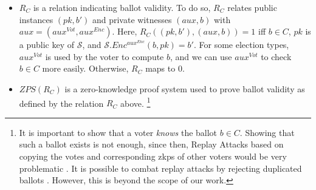 \begin{definition}
\begin{itemize}
    \item $R_C$ is a relation indicating ballot validity.
    To do so, $R_C$ relates public instances $(pk, b')$ and private witnesses $(aux, b)$ with $aux=(aux^{Vot}, aux^{Enc})$.
    Here, $R_C((pk, b'), (aux, b))=1$ iff $b\in C$, $pk$ is a public key of $\mathcal{S}$, and $\mathcal{S}.Enc^{aux^{Enc}}(b, pk)=b'$.
    For some election types, $aux^{Vot}$ is used by the voter to compute $b$, and we can use $aux^{Vot}$ to check $b\in C$ more easily.
    Otherwise, $R_C$ maps to $0$.
    \item $ZPS(R_C)$ is a zero-knowledge proof system used to prove ballot validity as defined by the relation $R_C$ above.%
    \footnote{\label{footnote:zkpKnowVsExists}
      It is important to show that a voter \textit{knows} the ballot $b\in C$. 
      Showing that such a ballot exists is not enough, since then, Replay Attacks based on copying the votes and corresponding \glspl{zkp} of other voters would be very problematic \cite{mestel_how_2022}. 
      It is possible to combat replay attacks by rejecting duplicated ballots \cite{mestel_how_2022}. However, this is beyond the scope of our work.

}
\end{itemize}
\end{definition}
